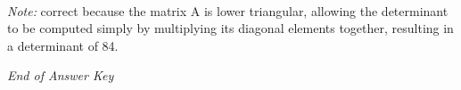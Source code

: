 \documentclass[12pt]{article}
\begin{document}
\begin{enumerate}[label=\arabic*.]
\\ \textit{Note:} correct because the matrix A is lower triangular, allowing the determinant to be computed simply by multiplying its diagonal elements together, resulting in a determinant of 84.
\end{enumerate}

\vfill
\noindent\textit{End of Answer Key}
\end{document}
